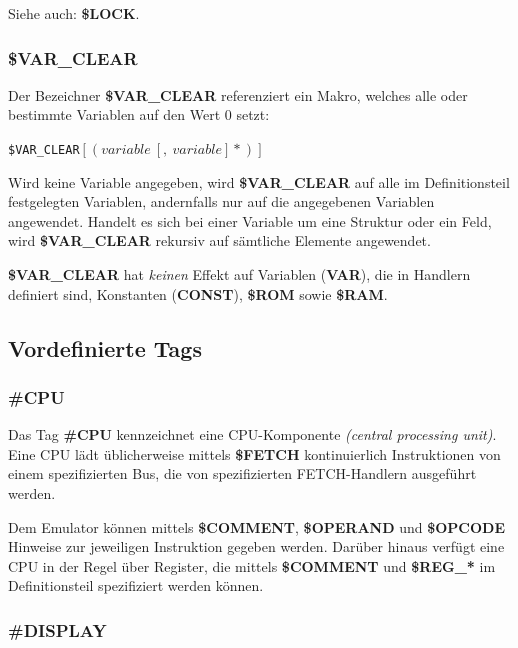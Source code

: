 \documentclass{scrartcl}
\begin{document}
\vspace{10pt}
\noindent Siehe auch: \textbf{\$LOCK}.

\subsubsection{\$VAR\_CLEAR}

\noindent Der Bezeichner \textbf{\$VAR\_CLEAR} referenziert ein Makro, welches alle oder bestimmte Variablen auf den Wert 0 setzt:

\vspace{10pt}
\texttt{\$VAR\_CLEAR$[(variable~[,~variable]*)]$}

\vspace{10pt}
\noindent Wird keine Variable angegeben, wird \textbf{\$VAR\_CLEAR} auf alle im Definitionsteil festgelegten Variablen, andernfalls nur auf die angegebenen Variablen angewendet. Handelt es sich bei einer Variable um eine Struktur oder ein Feld, wird \textbf{\$VAR\_CLEAR} rekursiv auf sämtliche Elemente angewendet.

\vspace{10pt}
\noindent \textbf{\$VAR\_CLEAR} hat \textit{keinen} Effekt auf Variablen (\textbf{VAR}), die in Handlern definiert sind, Konstanten (\textbf{CONST}), \textbf{\$ROM} sowie \textbf{\$RAM}.

\subsection{Vordefinierte Tags}

\subsubsection{\#CPU}

\noindent Das Tag \textbf{\#CPU} kennzeichnet eine CPU-Komponente \textit{(central processing unit)}. Eine CPU lädt üblicherweise mittels \textbf{\$FETCH} kontinuierlich Instruktionen von einem spezifizierten Bus, die von spezifizierten FETCH-Handlern ausgeführt werden.

\vspace{10pt}
\noindent Dem Emulator können mittels \textbf{\$COMMENT}, \textbf{\$OPERAND} und \textbf{\$OPCODE} Hinweise zur jeweiligen Instruktion gegeben werden. Darüber hinaus verfügt eine CPU in der Regel über Register, die mittels \textbf{\$COMMENT} und \textbf{\$REG\_*} im Definitionsteil spezifiziert werden können.

\subsubsection{\#DISPLAY}
\end{document}

